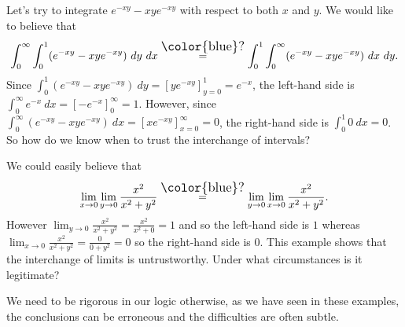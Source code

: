 \begin{example*}
  Let's try to integrate \(e^{-xy} - xye^{-xy}\) with respect to both \(x\) and \(y\).
  We would like to believe that
  \[
    \int_{0}^{\infty} \int_{0}^{1} (e^{-xy} - xye^{-xy}) \ dy \ dx
    \overset{\text{\large\color{blue}?}}{=} \int_{0}^{1} \int_{0}^{\infty}  (e^{-xy} - xye^{-xy}) \ dx \ dy.
  \]
  Since
  \( \int_{0}^{1} (e^{-xy} - xye^{-xy}) \ dy = {\left[ye^{-xy}\right]}_{y=0}^{1} = e^{-x}\),
  the left-hand side is
  \( \int_{0}^{\infty} e^{-x} \ dx = {\left[ -e^{-x} \right]}_{0}^{\infty} = 1 \).
  However, since
  \( \int_{0}^{\infty}  (e^{-xy} - xye^{-xy}) \ dx = {\left[ xe^{-xy} \right]}_{x=0}^{\infty} = 0\),
  the right-hand side is \(\int_{0}^{1} 0 \ dx = 0\).
  So how do we know when to trust the interchange of intervals?
\end{example*}


\begin{example*}
  We could easily believe that
  \[
    \lim_{x\to 0}\lim_{y\to 0} \frac{x^2}{x^2 + y^2}
    \overset{\text{\large\color{blue}?}}{=}
    \lim_{y\to 0}\lim_{x\to 0} \frac{x^2}{x^2 + y^2}.
  \]
  However \(\lim_{y\to 0} \frac{x^2}{x^2 + y^2} = \frac{x^2}{x^2 + 0} = 1 \) and so the left-hand side is \(1\)
  whereas \(\lim_{x\to 0} \frac{x^2}{x^2 + y^2} = \frac{0}{0 + y^2} = 0\) so the right-hand side is \(0\).
  This example shows that the interchange of limits is untrustworthy. Under what circumstances is it legitimate?
\end{example*}

We need to be rigorous in our logic otherwise, as we have seen in these examples, the conclusions can be erroneous and the difficulties are often subtle.

